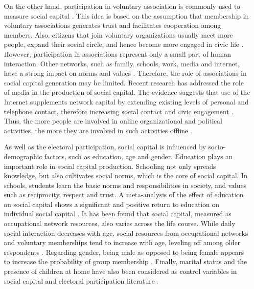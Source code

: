 \documentclass[onecolumn]{article}
\begin{document}
On the other hand, participation in voluntary association is commonly used to measure social capital \cite{putnam1995}.  This idea is based on the assumption that membership in voluntary associations generates trust and facilitates cooperation among members. Also, citizens that join voluntary organizations usually meet more people,  expand their social circle, and hence become more engaged in civic life \cite{verba}.  However, participation in associations represent only a small part of human interaction. Other networks, such as  family, schools, work, media and internet, have a strong impact on norms and values \cite{westlund}. Therefore, the role of associations in social capital generation may be limited. Recent research has addressed the role of media in the production of social capital. The evidence suggests that  use of the Internet supplements network capital by extending existing levels of personal and telephone contact, therefore increasing social contact and civic engagement \cite{horrigan2001,v2001internet}. Thus, the more people are involved in online organizational and political activities, the more they are involved in such activities offline \cite{wellman2001}.  


As well as the electoral participation, social capital is influenced by socio-demographic factors, such as education, age and gender. Education plays an important role in social capital production. Schooling not only spreads knowledge, but also cultivates social norms, which is the core of social capital. In schools, students learn the basic norms and responsibilities in society, and values such as reciprocity, respect and trust. A meta-analysis of the effect of education on social capital shows a significant and positive return to education on individual social capital \cite{huang}.  It has been found that social capital, measured as occupational network resources, also varies across the life course. While daily social interaction decreases with age, social resources from occupational networks and voluntary memberships tend to increase with age, leveling off among older respondents \cite{mcdonald}. Regarding gender, being male as opposed to being female appears to increase the probability of group membership \cite{greek}.  Finally, marital status and the presence of children at home have also been considered as control variables in social capital and electoral participation literature \cite{soroka,greek,carlin}.


\end{document}
